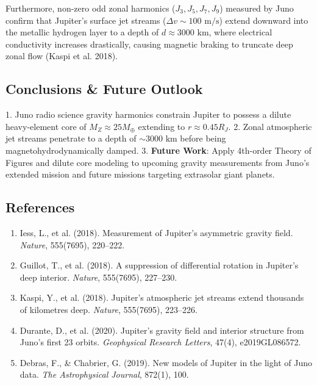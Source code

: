 \documentclass[11pt,a4paper]{article}
\begin{document}
Furthermore, non-zero odd zonal harmonics ($J_3, J_5, J_7, J_9$) measured by Juno confirm that Jupiter's surface jet streams ($\Delta v \sim 100\text{ m/s}$) extend downward into the metallic hydrogen layer to a depth of $d \approx 3000\text{ km}$, where electrical conductivity increases drastically, causing magnetic braking to truncate deep zonal flow (Kaspi et al. 2018).

\subsection{Conclusions \& Future Outlook}
1. Juno radio science gravity harmonics constrain Jupiter to possess a dilute heavy-element core of $M_Z \approx 25 M_{\oplus}$ extending to $r \approx 0.45 R_J$.
2. Zonal atmospheric jet streams penetrate to a depth of $\sim 3000\text{ km}$ before being magnetohydrodynamically damped.
3. \textbf{Future Work}: Apply 4th-order Theory of Figures and dilute core modeling to upcoming gravity measurements from Juno's extended mission and future missions targeting extrasolar giant planets.

\subsection*{References}
\begin{enumerate}
    \item Iess, L., et al. (2018). Measurement of Jupiter's asymmetric gravity field. \textit{Nature}, 555(7695), 220--222.
    \item Guillot, T., et al. (2018). A suppression of differential rotation in Jupiter's deep interior. \textit{Nature}, 555(7695), 227--230.
    \item Kaspi, Y., et al. (2018). Jupiter's atmospheric jet streams extend thousands of kilometres deep. \textit{Nature}, 555(7695), 223--226.
    \item Durante, D., et al. (2020). Jupiter's gravity field and interior structure from Juno's first 23 orbits. \textit{Geophysical Research Letters}, 47(4), e2019GL086572.
    \item Debras, F., \& Chabrier, G. (2019). New models of Jupiter in the light of Juno data. \textit{The Astrophysical Journal}, 872(1), 100.
\end{enumerate}

\newpage

\end{document}
